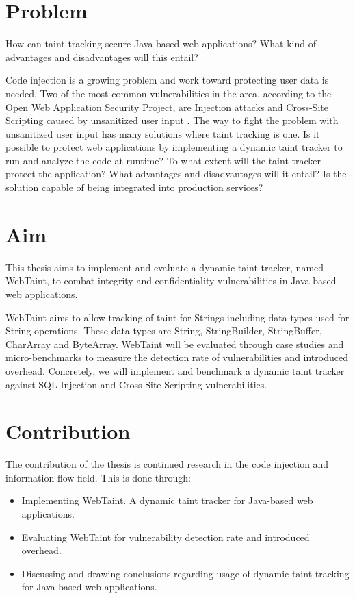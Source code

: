 \section{Problem}
\label{Problem}
\begin{chapquote}{}
    How can taint tracking secure Java-based web applications? What kind of advantages and disadvantages will this entail?
\end{chapquote}

\noindent
Code injection is a growing problem and work toward protecting user data is needed. Two of the most common vulnerabilities in the area, according to the Open Web Application Security Project, are Injection attacks and Cross-Site Scripting caused by unsanitized user input \parencite{OWASP2017}. The way to fight the problem with unsanitized user input has many solutions where taint tracking is one. Is it possible to protect web applications by implementing a dynamic taint tracker to run and analyze the code at runtime? To what extent will the taint tracker protect the application? What advantages and disadvantages will it entail? Is the solution capable of being integrated into production services?



\section{Aim}
\label{Aim}
This thesis aims to implement and evaluate a dynamic taint tracker, named WebTaint, to combat integrity and confidentiality vulnerabilities in Java-based web applications. 

WebTaint aims to allow tracking of taint for Strings including data types used for String operations. These data types are String, StringBuilder, StringBuffer, CharArray and ByteArray. WebTaint will be evaluated through case studies and micro-benchmarks to measure the detection rate of vulnerabilities and introduced overhead. Concretely, we will implement and benchmark a dynamic taint tracker against SQL Injection and Cross-Site Scripting vulnerabilities. 



\section{Contribution}
\label{Contribution}
The contribution of the thesis is continued research in the code injection and information flow field. This is done through:

\begin{itemize}  
    \item Implementing WebTaint. A dynamic taint tracker for Java-based web applications.
    \item Evaluating WebTaint for vulnerability detection rate and introduced overhead.
    \item Discussing and drawing conclusions regarding usage of dynamic taint tracking for Java-based web applications.
\end{itemize}



